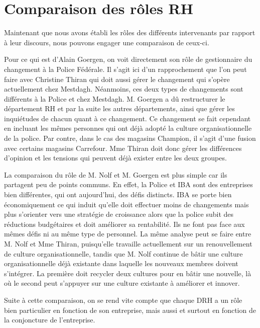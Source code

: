 \section{Comparaison des rôles RH}

Maintenant que nous avons établi les rôles des différents intervenants par rapport à leur discours, nous pouvons engager une comparaison de ceux-ci. \newline


Pour ce qui est d'Alain Goergen, on voit directement son rôle de gestionnaire du changement à la Police Fédérale. Il s'agit ici d'un rapprochement que l'on peut faire avec Christine Thiran qui doit aussi gérer le changement qui s'opère actuellement chez Mestdagh. Néanmoins, ces deux types de changements sont différents à la Police et chez Mestdagh. M. Goergen a dû restructurer le département RH et par la suite les autres départements, ainsi que gérer les inquiétudes de chacun quant à ce changement. Ce changement se fait cependant en incluant les mêmes personnes qui ont déjà adopté la culture organisationnelle de la police. Par contre, dans le cas des magasins Champion, il s'agit d'une fusion avec certains magasins Carrefour. Mme Thiran doit donc gérer les différences d'opinion et les tensions qui peuvent déjà exister entre les deux groupes.\newline

La comparaison du rôle de M. Nolf et M. Goergen est plus simple car ils partagent peu de points communs. En effet, la Police et IBA sont des entreprises bien différentes, qui ont aujourd'hui, des défis distincts. IBA se porte bien économiquement ce qui induit qu'elle doit effectuer moins de changements mais plus s'orienter vers une stratégie de croissance alors que la police subit des réductions budgétaires et doit améliorer sa rentabilité. Ils ne font pas face aux mêmes défis ni au même type de personnel. La même analyse peut se faire entre M. Nolf et Mme Thiran, puisqu'elle travaille actuellement sur un renouvellement de culture organisationnelle, tandis que M. Nolf continue de bâtir une culture organisationnelle déjà existante dans laquelle les nouveaux membres doivent s'intégrer. La première doit recycler deux cultures pour en bâtir une nouvelle, là où le second peut s'appuyer sur une culture existante à améliorer et innover.


Suite à cette comparaison, on se rend vite compte que chaque DRH a un rôle bien particulier en fonction de son entreprise, mais aussi et surtout en fonction de la conjoncture de l'entreprise.